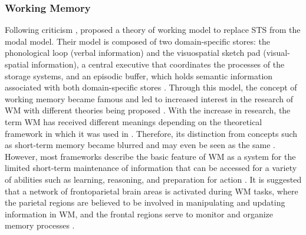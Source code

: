 \subsubsection{Working Memory}
Following criticism \parencite[see.,][]{raaijmakersStoryTwostoreModel1993}, \textcite{baddeleyWorkingMemory1974} proposed a theory of working model to replace STS from the modal model. Their model is composed of two domain-specific stores: the phonological loop (verbal information) and the visuospatial sketch pad (visual-spatial information),  a central executive that coordinates the processes of the storage systems, and an episodic buffer, which holds semantic information associated with both domain-specific stores \parencite{baddeleyEpisodicBufferNew2000, baddeleyWorkingMemory1974}.  Through this model, the concept of working memory became famous \parencite{abenDistinctionWorkingMemory2012} and led to increased interest in the research of WM with different theories being proposed \parencite{cowanManyFacesWorking2017, oberauerBenchmarksModelsShortterm2018}. With the increase in research, the term WM has received different meanings depending on the theoretical framework in which it was used in \parencite[see.,][]{cowanManyFacesWorking2017}. Therefore, its distinction from concepts such as short-term memory became blurred and may even be seen as the same \parencite[see.,][]{abenDistinctionWorkingMemory2012}. However, most frameworks describe the basic feature of WM as a system for the limited short-term maintenance of information \parencite{erikssonNeurocognitiveArchitectureWorking2015} that can be accessed for a variety of abilities such as learning, reasoning, and preparation for action \parencite{baddeleyWorkingMemory1974}. It is suggested that a network of frontoparietal brain areas is activated during WM tasks, where the parietal regions are believed to be involved in manipulating and updating information in WM, and the frontal regions serve to monitor and organize memory processes \parencite{cohenTemporalDynamicsBrain1997, koenigsSuperiorParietalCortex2009,vanasselenBrainAreasInvolved2006}.

